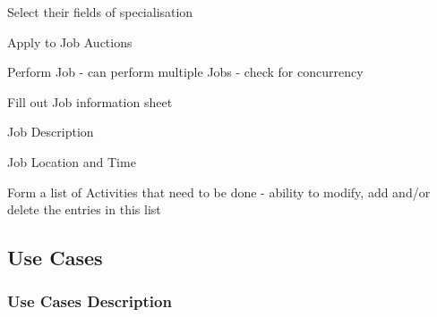 \begin{packed_enum}
				\item {}
				\begin{packed_enum}
					\item Select their fields of specialisation
					\item Apply to Job Auctions
					\item Perform Job - can perform multiple Jobs - check for concurrency
					\item Fill out Job information sheet
					\begin{packed_enum}
						\item Job Description
						\item Job Location and Time
						\item Form a list of Activities that need to be done - ability to modify, add and/or delete the entries in this list
					\end{packed_enum}
				\end{packed_enum}
				
			\end{packed_enum}
			\eject
				
			\subsection{Use Cases}
				
				\subsubsection{Use Cases Description}
					
